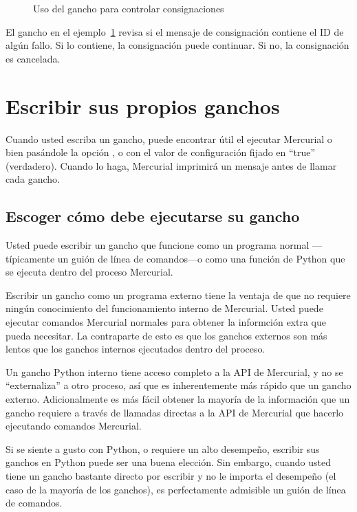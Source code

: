 \begin{figure}[ht]
  \caption{Uso del gancho  para controlar consignaciones}
  \label{ex:hook:pretxncommit}
\end{figure}

El gancho en el ejemplo~\ref{ex:hook:pretxncommit} revisa si el
mensaje de consignación contiene el ID de algún fallo. Si lo contiene,
la consignación puede continuar. Si no, la consignación es cancelada.

\section{Escribir sus propios ganchos}

Cuando usted escriba un gancho, puede encontrar útil el ejecutar
Mercurial o bien pasándole la opción , o con el valor de
configuración  fijado en ``true'' (verdadero).
Cuando lo haga, Mercurial imprimirá un mensaje antes de llamar cada
gancho.

\subsection{Escoger cómo debe ejecutarse su gancho}
\label{sec:hook:lang}

Usted puede escribir un gancho que funcione como un programa normal
---típicamente un guión de línea de comandos---o como una función de
Python que se ejecuta dentro del proceso Mercurial.

Escribir un gancho como un programa externo tiene la ventaja de que no
requiere ningún conocimiento del funcionamiento interno de Mercurial.
Usted puede ejecutar comandos Mercurial normales para obtener la
informción extra que pueda necesitar. La contraparte de esto es que
los ganchos externos son más lentos que los ganchos internos
ejecutados dentro del proceso.

Un gancho Python interno tiene acceso completo a la API de Mercurial,
y no se ``externaliza'' a otro proceso, así que es inherentemente más
rápido que un gancho externo. Adicionalmente es más fácil obtener la
mayoría de la información que un gancho requiere a través de llamadas
directas a la API de Mercurial que hacerlo ejecutando comandos
Mercurial.

Si se siente a gusto con Python, o requiere un alto desempeño,
escribir sus ganchos en Python puede ser una buena elección. Sin
embargo, cuando usted tiene un gancho bastante directo por escribir y
no le importa el desempeño (el caso de la mayoría de los ganchos), es
perfectamente admisible un guión de línea de comandos.

